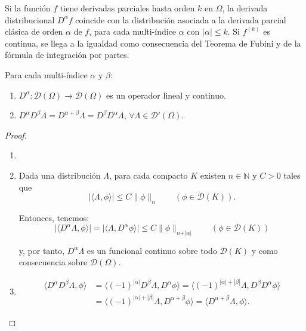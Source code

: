 \begin{observacion}
Si la función $f$ tiene derivadas parciales hasta orden $k$ en $\Omega$, la derivada distribucional
 $D^{\alpha}f$ coincide con la distribución asociada a la derivada parcial clásica de orden $\alpha$ de $f$, para cada multi-índice $\alpha$ 
con $\vert \alpha \vert \leq k$. Si $f^{(k)}$ es continua, se llega a la igualdad como consecuencia del Teorema de Fubini 
y de la fórmula de integración por partes.

\end{observacion}


\begin{proposicion}
Para cada multi-índice $\alpha$ y $\beta$: 
\begin{enumerate}
\item $D^{\alpha}:\mathcal{D}(\Omega)\rightarrow \mathcal{D}(\Omega)$ es un operador lineal y  continuo. %
\item $D^{\alpha}D^{\beta}\Lambda = D^{\alpha+\beta}\Lambda=D^{\beta}D^{\alpha}\Lambda$, $\forall \Lambda\in\mathcal{D}'(\Omega)$.
\end{enumerate}
\end{proposicion}

\begin{proof}
\begin{enumerate}
\item[]
\item Dada una distribución $\Lambda$, para cada 
compacto $K$ existen $n\in\mathds{N}$ y $C>0$ tales que 
\begin{equation}
\vert \langle\Lambda,\phi\rangle \vert \leq C \parallel \phi\parallel_{n} \qquad (\phi\in \mathcal{D}(K)).
\end{equation}

Entonces, tenemos:
\begin{equation}
\vert \langle D^{\alpha} \Lambda,\phi\rangle \vert = \vert \langle \Lambda, D^{\alpha}\phi\rangle \vert \leq C \parallel \phi\parallel_{n+\vert\alpha\vert} \qquad (\phi\in \mathcal{D}(K))
\end{equation}

y, por tanto, $D^{\alpha}\Lambda$ es un funcional continuo sobre todo $\mathcal{D}(K)$ y como consecuencia sobre $\mathcal{D}(\Omega)$.
\item   
\begin{align}
            \langle D^{\alpha}D^{\beta}\Lambda,\phi\rangle  
            & = \langle (-1)^{|\alpha|}  D^{\beta}\Lambda, D^{\alpha}\phi\rangle = \langle (-1)^{|\alpha|+|\beta|} \Lambda,D^{\beta}D^{\alpha}\phi\rangle\\ 
            & = \langle(-1)^{|\alpha|+|\beta|} \Lambda,D^{\alpha+\beta}\phi\rangle = \langle D^{\alpha + \beta}\Lambda ,\phi\rangle.
\end{align}
\end{enumerate}
\end{proof}

